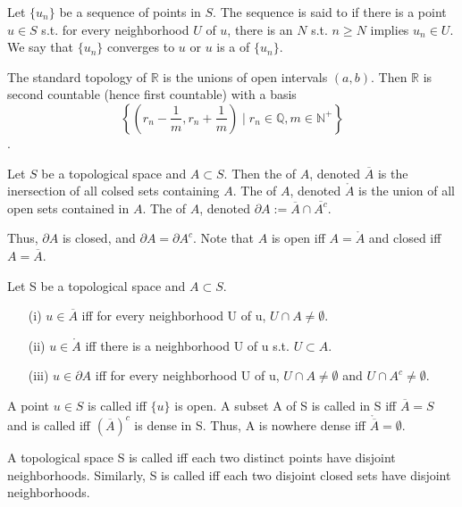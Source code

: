 Let $\{u_n\}$ be a sequence of points in $S$. The sequence is said to  if there is a point $u\in S$ s.t.
for every neighborhood $U$ of $u$, there is an $N$ s.t. $n\geq N$ implies $u_n\in U$. We say that $\{u_n\}$ converges
to $u$ or $u$ is a  of $\{u_n\}$.
\begin{example}
The standard topology of $\mathbb{R}$ is the unions of open intervals $(a,b)$. Then  $\mathbb{R}$ is second countable
(hence first countable) with a basis $$\left\lbrace\left(r_n-\frac{1}{m},r_n+\frac{1}{m}\right)\mid r_n\in\mathbb{Q},m\in 
\mathbb{N}^+\right\rbrace$$.
\end{example}
\begin{definition}
Let $S$ be a topological space and $A\subset S$. Then the  of $A$, denoted $\overline{A}$ is the inersection
of all colsed sets containing $A$. The  of $A$, denoted $\mathring{A}$ is the union of all open sets contained 
in $A$. The  of $A$, denoted $\partial A := \overline{A}\cap \overline{A^c}$.
\end{definition}
Thus, $\partial A$ is closed, and $\partial A = \partial A^c$. Note that $A$ is open iff $A=\mathring{A}$ and closed iff
$A=\overline{A}$.
\begin{prop}
Let S be a topological space  and $A\subset S$.
\begin{enumerate}
\item[(i)] $u\in \overline{A}$ iff for every neighborhood U of u, $U\cap A\neq \emptyset$.
\item[(ii)] $u\in\mathring{A}$ iff there is a neighborhood U of u s.t. $U\subset A$.
\item[(iii)] $u\in\partial A$ iff for every neighborhood U of u, $U\cap A\neq\emptyset$ and $U\cap A^c\neq\emptyset$.
\end{enumerate}
\end{prop}
\begin{definition}
A point $u\in S$ is called  iff $\{u\}$ is open. A subset A of S is called  in S iff $\overline{A}=S$
and is called  iff $(\overline{A})^c$ is dense in S. Thus, A is nowhere dense iff $\mathring{\overline{A}}
=\emptyset$.
\end{definition}
\begin{definition}
A topological space S is called  iff each two distinct points have disjoint neighborhoods. Similarly, S is called
 iff each two disjoint closed sets have disjoint neighborhoods.
\end{definition}
